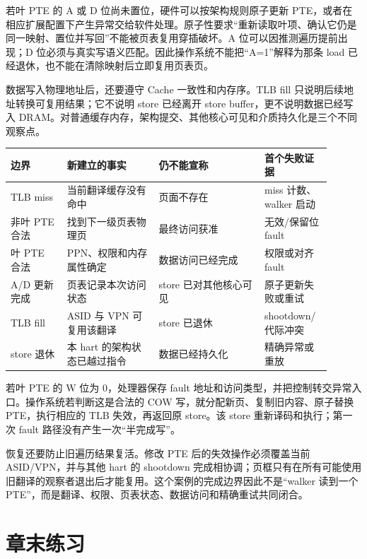 
若叶 PTE 的 A 或 D 位尚未置位，硬件可以按架构规则原子更新 PTE，或者在相应扩展配置下产生异常交给软件处理。原子性要求“重新读取叶项、确认它仍是同一映射、置位并写回”不能被页表复用穿插破坏。A 位可以因推测遍历提前出现；D 位必须与真实写语义匹配。因此操作系统不能把“A=1”解释为那条 load 已经退休，也不能在清除映射后立即复用页表页。

数据写入物理地址后，还要遵守 Cache 一致性和内存序。TLB fill 只说明后续地址转换可复用结果；它不说明 store 已经离开 store buffer，更不说明数据已经写入 DRAM。对普通缓存内存，架构提交、其他核心可见和介质持久化是三个不同观察点。

\begin{longtable}{L{0.16\linewidth}L{0.26\linewidth}L{0.30\linewidth}L{0.18\linewidth}}
\toprule
边界 & 新建立的事实 & 仍不能宣称 & 首个失败证据 \\
\midrule
TLB miss & 当前翻译缓存没有命中 & 页面不存在 & miss 计数、walker 启动 \\\tablerowrule
非叶 PTE 合法 & 找到下一级页表物理页 & 最终访问获准 & 无效/保留位 fault \\\tablerowrule
叶 PTE 合法 & PPN、权限和内存属性确定 & 数据访问已经完成 & 权限或对齐 fault \\\tablerowrule
A/D 更新完成 & 页表记录本次访问状态 & store 已对其他核心可见 & 原子更新失败或重试 \\\tablerowrule
TLB fill & ASID 与 VPN 可复用该翻译 & store 已退休 & shootdown/代际冲突 \\\tablerowrule
store 退休 & 本 hart 的架构状态已越过指令 & 数据已经持久化 & 精确异常或重放 \\
\bottomrule
\end{longtable}


若叶 PTE 的 W 位为 0，处理器保存 fault 地址和访问类型，并把控制转交异常入口。操作系统若判断这是合法的 COW 写，就分配新页、复制旧内容、原子替换 PTE，执行相应的 TLB 失效，再返回原 store。该 store 重新译码和执行；第一次 fault 路径没有产生一次“半完成写”。

恢复还要防止旧遍历结果复活。修改 PTE 后的失效操作必须覆盖当前 ASID/VPN，并与其他 hart 的 shootdown 完成相协调；页框只有在所有可能使用旧翻译的观察者退出后才能复用。这个案例的完成边界因此不是“walker 读到一个 PTE”，而是翻译、权限、页表状态、数据访问和精确重试共同闭合。

\section*{章末练习}

